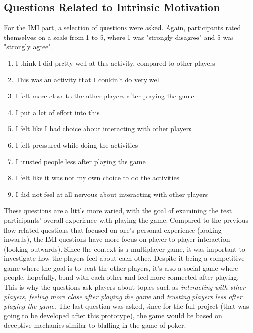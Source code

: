 \subsection{Questions Related to Intrinsic Motivation}
For the IMI part, a selection of questions were asked. Again, participants rated themselves on a scale from 1 to 5, where 1 was "strongly disagree" and 5 was "strongly agree".

\begin{enumerate}
\item I think I did pretty well at this activity, compared to other players
\item This was an activity that I couldn't do very well
\item I felt more close to the other players after playing the game
\item I put a lot of effort into this
\item I felt like I had choice about interacting with other players
\item I felt pressured while doing the activities
\item I trusted people less after playing the game
\item I felt like it was not my own choice to do the activities
\item I did not feel at all nervous about interacting with other players
\end{enumerate}

These questions are a little more varied, with the goal of examining the test participants' overall experience with playing the game. Compared to the previous flow-related questions that focused on one's personal experience (looking inwards), the IMI questions have more focus on player-to-player interaction (looking outwards). Since the context is a multiplayer game, it was important to investigate how the players feel about each other. Despite it being a competitive game where the goal is to beat the other players, it's also a social game where people, hopefully, bond with each other and feel more connected after playing. This is why the questions ask players about topics such as \textit{interacting with other players}, \textit{feeling more close after playing the game} and \textit{trusting players less after playing the game}. The last question was asked, since for the full project (that was going to be developed after this prototype), the game would be based on deceptive mechanics similar to bluffing in the game of poker.
